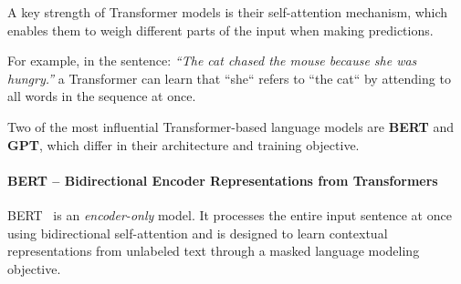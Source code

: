A key strength of Transformer models is their self-attention mechanism, which enables them to weigh different parts of the input when making predictions.

For example, in the sentence:
\textit{``The cat chased the mouse because she was hungry.''
}
a Transformer can learn that ``she`` refers to ``the cat`` by attending to all words in the sequence at once.





Two of the most influential Transformer-based language models are \textbf{BERT} and \textbf{GPT}, which differ in their architecture and training objective.

\paragraph{BERT – Bidirectional Encoder Representations from Transformers}
BERT~\cite{BERT} is an \textit{encoder-only} model. It processes the entire input sentence at once using bidirectional self-attention and is designed to learn contextual representations from unlabeled text through a masked language modeling objective.


